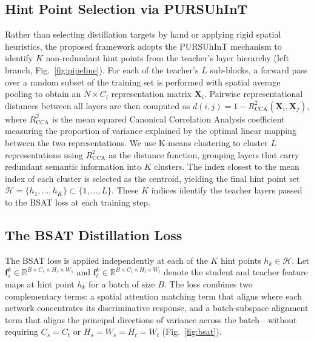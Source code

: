 \documentclass[conference]{IEEEtran}
\begin{document}
\subsection{Hint Point Selection via PURSUhInT}
\label{sec:pursuhint}
\par
Rather than selecting distillation targets by hand or applying rigid
spatial heuristics, the proposed framework adopts the PURSUhInT
mechanism \cite{keser2023pursuhint} to identify $K$ non-redundant
hint points from the teacher's layer hierarchy (left branch, Fig.~\ref{fig:pipeline}).
For each of the teacher's $L$ sub-blocks, a forward pass over a
random subset of the training set is performed with spatial average
pooling to obtain an $N \times C_i$ representation matrix
$\mathbf{X}_i$. Pairwise representational distances between all
layers are then computed as $d(i, j) = 1 - R^2_{\mathrm{CCA}}
(\mathbf{X}_i, \mathbf{X}_j)$, where $R^2_{\mathrm{CCA}}$ is the
mean squared Canonical Correlation Analysis coefficient
\cite{kornblith2019similarity} measuring the proportion of variance
explained by the optimal linear mapping between the two
representations. We use K-means clustering to cluster $L$ representations 
using $R^2_{\mathrm{CCA}}$ as the distance function, grouping layers that carry 
redundant semantic information into $K$ clusters. The index closest to the mean index
of each cluster is selected as the centroid, yielding the final hint
point set $\mathcal{H} = \{h_1, \ldots, h_K\} \subset \{1, \ldots,
L\}$. These $K$ indices identify the teacher layers passed to the
BSAT loss at each training step.


\subsection{The BSAT Distillation Loss}
\label{sec:bsat}
\par
The BSAT loss is applied independently at each of the $K$ hint points
$h_k \in \mathcal{H}$. Let $\mathbf{f}_s^k \in \mathbb{R}^{B \times
C_s \times H_s \times W_s}$ and $\mathbf{f}_t^k \in \mathbb{R}^{B
\times C_t \times H_t \times W_t}$ denote the student and teacher
feature maps at hint point $h_k$ for a batch of size $B$. The loss
combines two complementary terms: a spatial attention matching term
that aligns where each network concentrates its discriminative
response, and a batch-subspace alignment term that aligns the
principal directions of variance across the batch—without requiring
$C_s = C_t$ or $H_s = W_s = H_t = W_t$ (Fig.~\ref{fig:bsat}).
\end{document}
